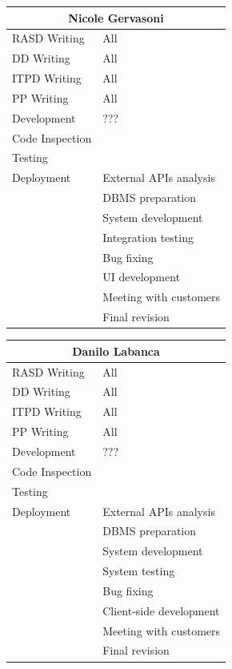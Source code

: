 \documentclass[english]{article}
\begin{document}
\begin{center}
	\begin{tabular}{|p{3cm}|p{4cm}|}
		\hline
		\multicolumn{2}{|c|}{\textbf{Nicole Gervasoni}}\\
		\hline
		RASD Writing & All\\
		\hline
		DD Writing & All\\
		\hline
		ITPD Writing & All\\
		\hline
		PP Writing & All\\
		\hline
		Development & ???\\
		Code Inspection & \\
		Testing & \\
		\hline
		Deployment & External APIs analysis\\
		& DBMS preparation\\
		& System development\\
		& Integration testing\\
		& Bug fixing\\
		& UI development\\
		& Meeting with customers\\
		& Final revision\\
		\hline
	\end{tabular}
\end{center}

\begin{center}
	\begin{tabular}{|p{3cm}|p{4cm}|}
		\hline
		\multicolumn{2}{|c|}{\textbf{Danilo Labanca}}\\
		\hline
		RASD Writing & All \\ 
		\hline
		DD Writing & All \\ 
		\hline
		ITPD Writing & All \\ 
		\hline
		PP Writing & All \\ 
		\hline
		Development & ???\\ 
		Code Inspection & \\ 
		Testing & \\ 
		\hline
		Deployment & External APIs analysis\\
		& DBMS preparation\\
		& System development\\ 
		& System testing\\
		& Bug fixing\\ 
		& Client-side development\\ 
		& Meeting with customers\\ 
		& Final revision\\ 
		\hline
	\end{tabular}
\end{center}
\end{document}
